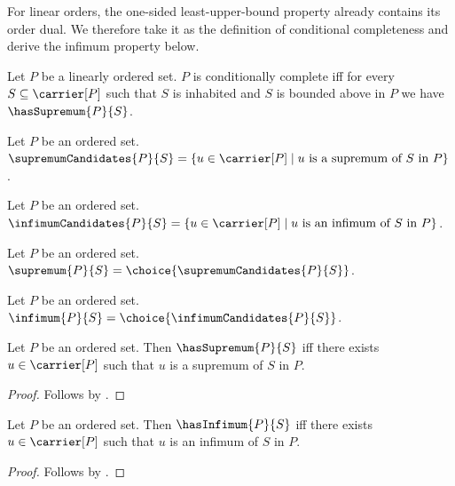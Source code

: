 For linear orders, the one-sided least-upper-bound property already contains
its order dual.  We therefore take it as the definition of conditional
completeness and derive the infimum property below.

\begin{definition}\label{conditionally_complete_linear_order}
    Let $P$ be a linearly ordered set.
    $P$ is conditionally complete iff for every
        $S\subseteq\carrier[P]$ such that $S$ is inhabited and
        $S$ is bounded above in $P$ we have $\hasSupremum{P}{S}$.
\end{definition}

\begin{definition}\label{supremum_candidates}
    Let $P$ be an ordered set.
    $\supremumCandidates{P}{S}
        =\{u\in\carrier[P]\mid
            \text{$u$ is a supremum of $S$ in $P$}\}$.
\end{definition}

\begin{definition}\label{infimum_candidates}
    Let $P$ be an ordered set.
    $\infimumCandidates{P}{S}
        =\{u\in\carrier[P]\mid
            \text{$u$ is an infimum of $S$ in $P$}\}$.
\end{definition}

\begin{definition}\label{supremum}
    Let $P$ be an ordered set.
    $\supremum{P}{S}=\choice{\supremumCandidates{P}{S}}$.
\end{definition}

\begin{definition}\label{infimum}
    Let $P$ be an ordered set.
    $\infimum{P}{S}=\choice{\infimumCandidates{P}{S}}$.
\end{definition}

\begin{proposition}\label{has_supremum_iff}
    Let $P$ be an ordered set.
    Then $\hasSupremum{P}{S}$ iff
        there exists $u\in\carrier[P]$ such that
            $u$ is a supremum of $S$ in $P$.
\end{proposition}
\begin{proof}
    Follows by .
\end{proof}

\begin{proposition}\label{has_infimum_iff}
    Let $P$ be an ordered set.
    Then $\hasInfimum{P}{S}$ iff
        there exists $u\in\carrier[P]$ such that
            $u$ is an infimum of $S$ in $P$.
\end{proposition}
\begin{proof}
    Follows by .
\end{proof}

